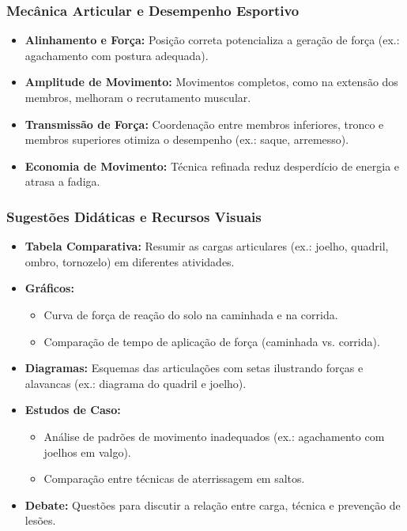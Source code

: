 \documentclass{beamer}
\begin{document}
\begin{frame}
\frametitle{Mecânica Articular e Desempenho Esportivo}
\begin{itemize}
    \item \textbf{Alinhamento e Força:} Posição correta potencializa a geração de força (ex.: agachamento com postura adequada).
    \item \textbf{Amplitude de Movimento:} Movimentos completos, como na extensão dos membros, melhoram o recrutamento muscular.
    \item \textbf{Transmissão de Força:} Coordenação entre membros inferiores, tronco e membros superiores otimiza o desempenho (ex.: saque, arremesso).
    \item \textbf{Economia de Movimento:} Técnica refinada reduz desperdício de energia e atrasa a fadiga.
\end{itemize}
\end{frame}

\begin{frame}
\frametitle{Sugestões Didáticas e Recursos Visuais}
\begin{itemize}
    \item \textbf{Tabela Comparativa:} Resumir as cargas articulares (ex.: joelho, quadril, ombro, tornozelo) em diferentes atividades.
    \item \textbf{Gráficos:} 
    \begin{itemize}
        \item Curva de força de reação do solo na caminhada e na corrida.
        \item Comparação de tempo de aplicação de força (caminhada vs. corrida).
    \end{itemize}
    \item \textbf{Diagramas:} Esquemas das articulações com setas ilustrando forças e alavancas (ex.: diagrama do quadril e joelho).
    \item \textbf{Estudos de Caso:}
    \begin{itemize}
        \item Análise de padrões de movimento inadequados (ex.: agachamento com joelhos em valgo).
        \item Comparação entre técnicas de aterrissagem em saltos.
    \end{itemize}
    \item \textbf{Debate:} Questões para discutir a relação entre carga, técnica e prevenção de lesões.
\end{itemize}
\end{frame}
\end{document}
